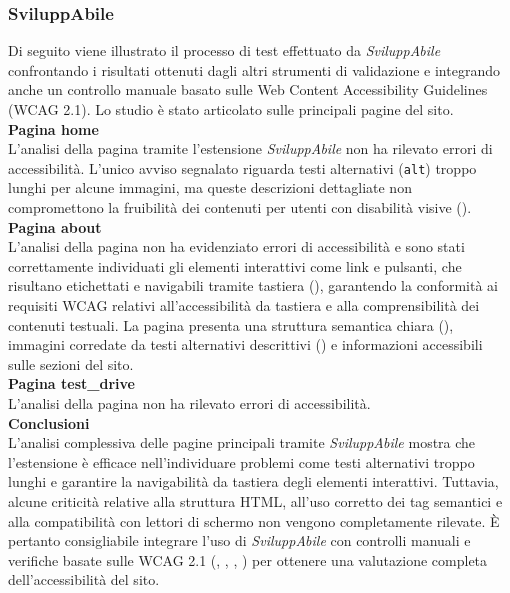 \subsubsection{SviluppAbile}
\noindent Di seguito viene illustrato il processo di test effettuato da \textit{SviluppAbile} confrontando i risultati ottenuti dagli altri strumenti di validazione e integrando anche un controllo manuale basato sulle Web Content Accessibility Guidelines (WCAG 2.1). Lo studio è stato articolato sulle principali pagine del sito.\\

\noindent \textbf{Pagina home}\\
L’analisi della pagina tramite l’estensione \textit{SviluppAbile} non ha rilevato errori di accessibilità. L’unico avviso segnalato riguarda testi alternativi (\texttt{alt}) troppo lunghi per alcune immagini, ma queste descrizioni dettagliate non compromettono la fruibilità dei contenuti per utenti con disabilità visive ({}). \\

\noindent \textbf{Pagina about}\\
L’analisi della pagina non ha evidenziato errori di accessibilità e sono stati correttamente individuati gli elementi interattivi come link e pulsanti, che risultano etichettati e navigabili tramite tastiera ({}), garantendo la conformità ai requisiti WCAG relativi all’accessibilità da tastiera e alla comprensibilità dei contenuti testuali.  
La pagina presenta una struttura semantica chiara ({}), immagini corredate da testi alternativi descrittivi ({}) e informazioni accessibili sulle sezioni del sito.\\

\noindent \textbf{Pagina test\_drive}\\
L’analisi della pagina non ha rilevato errori di accessibilità.\\

\noindent \textbf{Conclusioni}\\
L’analisi complessiva delle pagine principali tramite \textit{SviluppAbile} mostra che l’estensione è efficace nell’individuare problemi come testi alternativi troppo lunghi e garantire la navigabilità da tastiera degli elementi interattivi. Tuttavia, alcune criticità relative alla struttura HTML, all’uso corretto dei tag semantici e alla compatibilità con lettori di schermo non vengono completamente rilevate.  
È pertanto consigliabile integrare l’uso di \textit{SviluppAbile} con controlli manuali e verifiche basate sulle WCAG 2.1 ({}, {}, {}, {}) per ottenere una valutazione completa dell’accessibilità del sito.


